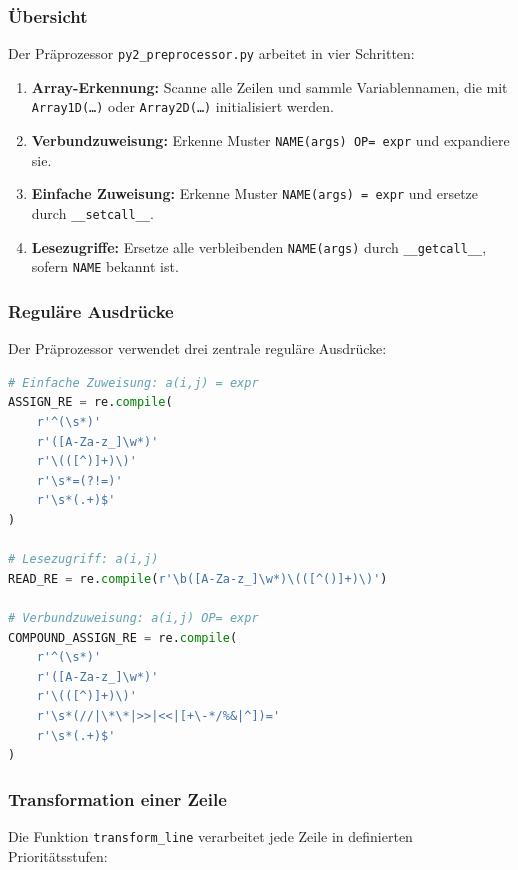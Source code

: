 \documentclass[a4paper,12pt]{article}
\theoremstyle{definition}
\begin{document}
\subsubsection{\"Ubersicht}

Der Pr\"aprozessor \texttt{py2\_preprocessor.py} arbeitet in vier Schritten:

\begin{enumerate}
	\item \textbf{Array-Erkennung:} Scanne alle Zeilen und sammle Variablennamen,
	      die mit \texttt{Array\newline 1D(\ldots)} oder \texttt{Array2D(\ldots)} initialisiert werden.
	\item \textbf{Verbundzuweisung:} Erkenne Muster \texttt{NAME(args) OP= expr}
	      und expandiere sie.
	\item \textbf{Einfache Zuweisung:} Erkenne Muster \texttt{NAME(args) = expr}
	      und ersetze durch \texttt{\_\_setcall\_\_}.
	\item \textbf{Lesezugriffe:} Ersetze alle verbleibenden \texttt{NAME(args)}
	      durch \texttt{\_\_getcall\_\_}, sofern \texttt{NAME} bekannt ist.
\end{enumerate}

\subsubsection{Regul\"are Ausdr\"ucke}

Der Pr\"aprozessor verwendet drei zentrale regul\"are Ausdr\"ucke:

\begin{lstlisting}[language=Python, caption={Regul\"are Ausdr\"ucke des Pr\"aprozessors}]
# Einfache Zuweisung: a(i,j) = expr
ASSIGN_RE = re.compile(
    r'^(\s*)'
    r'([A-Za-z_]\w*)'
    r'\(([^)]+)\)'
    r'\s*=(?!=)'
    r'\s*(.+)$'
)

# Lesezugriff: a(i,j)
READ_RE = re.compile(r'\b([A-Za-z_]\w*)\(([^()]+)\)')

# Verbundzuweisung: a(i,j) OP= expr
COMPOUND_ASSIGN_RE = re.compile(
    r'^(\s*)'
    r'([A-Za-z_]\w*)'
    r'\(([^)]+)\)'
    r'\s*(//|\*\*|>>|<<|[+\-*/%&|^])='
    r'\s*(.+)$'
)
\end{lstlisting}

\subsubsection{Transformation einer Zeile}

Die Funktion \texttt{transform\_line} verarbeitet jede Zeile in definierten
Priorit\"atsstufen:
\end{document}
